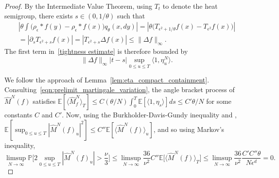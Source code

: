 \documentclass[EJP]{ejpecp} %
\newcommand{\IP}{\mathbb P}
\newcommand{\IE}{\mathbb E}
\newcommand{\citet}[1]{\cite{#1}}
\begin{document}
\begin{proof}
By the Intermediate Value Theorem, using $T_t$ to denote the heat semigroup,
there exists $s\in (0,1/\theta)$ such that
\begin{multline*}
\left|
\theta\int\big(\rho_\epsilon*f(y)-\rho_\epsilon*f(x)\big)
q_{\theta}(x,dy) \right|
=
\left|\theta\Big(T_{\epsilon^2+1/\theta}f(x)-T_{\epsilon^2}f(x)\Big)\right|
\\
=
\left|\partial_sT_{\epsilon^2+s}f(x)\right|=\left|T_{\epsilon^2+s}\Delta f(x)\right|
\leq\|\Delta f\|_\infty.
\end{multline*}
The first term in~\eqref{tightness estimate} is therefore bounded by
$$
    \| \Delta f \|_\infty |t-s| \sup_{0 \leq u \leq T } \langle 1, \eta_u^N \rangle .
$$

We follow the approach of Lemma~\ref{lem:eta_compact_containment}.
Consulting~\eqref{eqn:prelimit_martingale_variation},
the angle bracket process of $\widehat{M}^N(f)$ satisfies
$ \IE[\langle\widehat{M}^N_f\rangle_T] \le C (\theta/N) \int_0^T \IE[\langle 1, \eta_s \rangle] ds \le C' \theta/N$
for some constants $C$ and $C'$.
Now, using the Burkholder-Davis-Gundy inequality and \citet{barlow/jacka/yor:1986}, 
$\IE[\sup_{0 \le u \le T} |\widehat{M}^N(f)_u|^2] \le C'' \IE[\langle\widehat{M}^N(f)\rangle_u]$,
and so using Markov's inequality,
\begin{equation}
\label{martingale term to zero}
    \limsup_{N\to\infty}\IP\Big[
        2\sup_{0\leq u\leq T}|\widehat{M}^N(f)_u|
        >\frac{\nu}{3}
    \Big]
    \leq
    \limsup_{N\to\infty} \frac{36}{\nu^2} C'' \IE\big[\langle\widehat{M}^N(f)\rangle_T\big]
    \leq
    \limsup_{N\to\infty}\frac{36}{\nu^2}\frac{C' C''\theta}{N\epsilon^d} 
    =0. 
\end{equation}


\end{proof}
\end{document}
